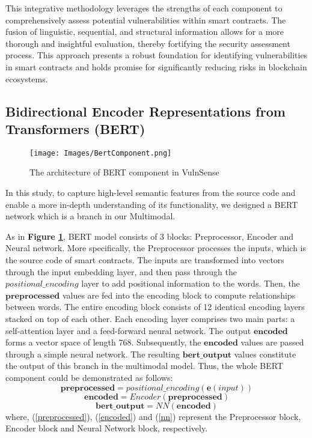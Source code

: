 This integrative methodology leverages the strengths of each component to comprehensively assess potential vulnerabilities within smart contracts. The fusion of linguistic, sequential, and structural information allows for a more thorough and insightful evaluation, thereby fortifying the security assessment process. This approach presents a robust foundation for identifying vulnerabilities in smart contracts and holds promise for significantly reducing risks in blockchain ecosystems.

\subsection{Bidirectional Encoder Representations from Transformers (BERT)}%
\begin{figure}[h] 
\centering
\texttt{[image: Images/BertComponent.png]}
\caption{The architecture of BERT component in VulnSense} \label{fig:bert_model}
\end{figure}

In this study, to capture high-level semantic features from the source code and enable a more in-depth understanding of its functionality, we designed a BERT network which is a branch in our Multimodal.

As in \textbf{Figure \ref{fig:bert_model}}, BERT model consists of 3 blocks: Preprocessor, Encoder and Neural network. More specifically, the Preprocessor processes the inputs, which is the source code of smart contracts. The inputs are transformed into vectors through the input embedding layer, and then pass through the $positional\_encoding$  layer to add positional information to the words. Then, the $\mathbf{preprocessed}$ values are fed into the encoding block  to compute relationships between words. The entire encoding block consists of 12 identical encoding layers stacked on top of each other. Each encoding layer comprises two main parts: a self-attention layer and a feed-forward neural network. The output $\mathbf{encoded}$ forms a vector space of length 768. Subsequently, the $\mathbf{encoded}$ values are passed through a simple neural network. The resulting $\mathbf{bert\_output}$ values constitute the output of this branch in the multimodal model. Thus, the whole BERT component could be demonstrated as follows:
\begin{equation} 
    \mathbf{preprocessed} = positional\_encoding(\mathbf{e}(input))
    \label{preprocessed}
\end{equation}
\begin{equation}
    \mathbf{encoded} = Encoder(\mathbf{preprocessed})
    \label{encoded}
\end{equation}
\begin{equation}
    \mathbf{bert\_output} = NN(\mathbf{encoded})
    \label{nn}
\end{equation}
where, (\ref{preprocessed}), (\ref{encoded}) and (\ref{nn}) represent the Preprocessor block, Encoder block and Neural Network block, respectively.

